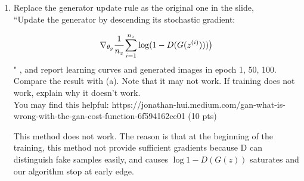 \documentclass[a4paper]{article}
\theoremstyle{definition}
\newenvironment{soln}{
	\leavevmode\color{blue}\ignorespaces
}{}
\begin{document}
\begin{enumerate} [label=(\alph*)]
	      \pagebreak
	\item Replace the generator update rule as the original one in the slide,\\
	      ``Update the generator by descending its stochastic gradient:

	      $$\nabla_{\theta_{g}}  \cfrac{1}{n_{z}}  \sum_{i=1}^{n_{z}}\log (1-D(G(z^{(i)})))\big )$$
	      "
	      , and report learning curves and generated images in epoch 1, 50, 100. Compare the result with (a). Note that it may not work. If training does not work, explain why it doesn't work. \\
	      You may find this helpful: https://jonathan-hui.medium.com/gan-what-is-wrong-with-the-gan-cost-function-6f594162ce01
	      \hfill (10 pts)

	      \begin{soln}
		      This method does not work. The reason is that at the beginning of the training, this method not provide sufficient gradients because D can distinguish fake samples easily, and causes $\log{ 1 - D(G(z)) }$ saturates and our algorithm stop at early edge. \cite{goodfellow2014generative}


\end{soln}
\end{enumerate}
\end{document}
